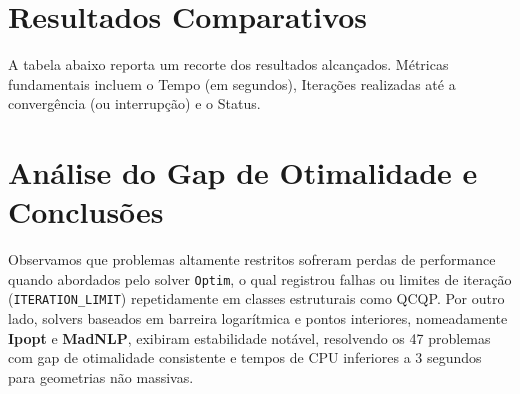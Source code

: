 \documentclass[preprint,12pt]{elsarticle}
\begin{document}
\section{Resultados Comparativos}
A tabela abaixo reporta um recorte dos resultados alcan\c{c}ados. M\'etricas fundamentais incluem o Tempo (em segundos), Itera\c{c}\~oes realizadas at\'e a converg\^encia (ou interrup\c{c}\~ao) e o Status.

\begin{table}[h]
\centering
\caption{Comparativo de Performance dos Solvers (Recorte)}
\label{tab:results}
\end{table}

\section{An\'alise do Gap de Otimalidade e Conclusões}
Observamos que problemas altamente restritos sofreram perdas de performance quando abordados pelo solver \texttt{Optim}, o qual registrou falhas ou limites de itera\c{c}\~ao (\texttt{ITERATION\_LIMIT}) repetidamente em classes estruturais como QCQP. 
Por outro lado, solvers baseados em barreira logarítmica e pontos interiores, nomeadamente \textbf{Ipopt} e \textbf{MadNLP}, exibiram estabilidade not\'avel, resolvendo os 47 problemas com gap de otimalidade consistente e tempos de CPU inferiores a 3 segundos para geometrias n\~ao massivas.

 

\end{document}
